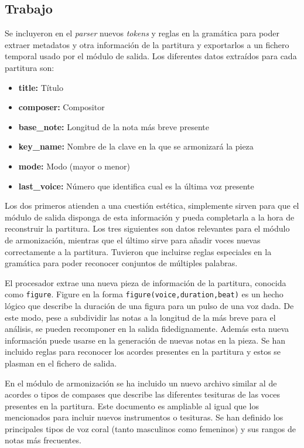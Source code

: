 \subsection{Trabajo}
Se incluyeron en el \textit{parser} nuevos \textit{tokens} y reglas en la gramática para poder extraer metadatos y otra información de la partitura y exportarlos a un fichero temporal usado por el módulo de salida. Los diferentes datos extraídos para cada partitura son:
\begin{itemize}
	\item \textbf{title:} Título
	\item \textbf{composer:} Compositor
	\item \textbf{base\_note:} Longitud de la nota más breve presente
	\item \textbf{key\_name:} Nombre de la clave en la que se armonizará la pieza
	\item \textbf{mode:} Modo (mayor o menor)
	\item \textbf{last\_voice:} Número que identifica cual es la última voz presente
\end{itemize}
Los dos primeros atienden a una cuestión estética, simplemente sirven para que el módulo de salida disponga de esta información y pueda completarla a la hora de reconstruir la partitura. Los tres siguientes son datos relevantes para el módulo de armonización, mientras que el último sirve para añadir voces nuevas correctamente a la partitura. Tuvieron que incluirse reglas especiales en la gramática para poder reconocer conjuntos de múltiples palabras.

El procesador extrae una nueva pieza de información de la partitura, conocida como \texttt{figure}. Figure en la forma \texttt{figure(voice,duration,beat)} es un hecho lógico que describe la duración de una figura para un pulso de una voz dada. De este modo, pese a subdividir las notas a la longitud de la más breve para el análisis, se pueden recomponer en la salida fidedignamente. Además esta nueva información puede usarse en la generación de nuevas notas en la pieza. Se han incluido reglas para reconocer los acordes presentes en la partitura y estos se plasman en el fichero de salida.

En el módulo de armonización se ha incluido un nuevo archivo similar al de acordes o tipos de compases que describe las diferentes tesituras de las voces presentes en la partitura. Este documento es ampliable al igual que los mencionados para incluir nuevos instrumentos o tesituras. Se han definido los principales tipos de voz coral (tanto masculinos como femeninos) y sus rangos de notas más frecuentes. 

